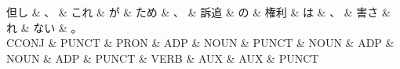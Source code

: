 \documentclass[tikz,border=5pt]{standalone}
\begin{document}
\normalsize
\begin{dependency}[edge unit distance=12.0pt]
    \begin{deptext}[column sep=1em]
        但し \& 、 \& これ \& が \& ため \& 、 \& 訴追 \& の \& 権利 \& は \& 、 \& 害さ \& れ \& ない \& 。\\
        CCONJ \& PUNCT \& PRON \& ADP \& NOUN \& PUNCT \& NOUN \& ADP \& NOUN \& ADP \& PUNCT \& VERB \& AUX \& AUX \& PUNCT\\
    \end{deptext}
\end{dependency}
\end{document}
